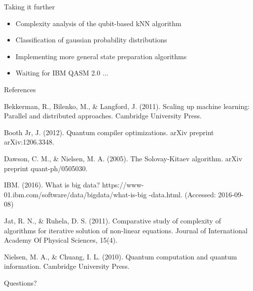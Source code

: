 \documentclass[10pt]{beamer}
\begin{document}
\begin{frame}{Taking it further}

\begin{itemize}
\item Complexity analysis of the qubit-based kNN algorithm
\item Classification of gaussian probability distributions
\item Implementing more general state preparation algorithms
\item Waiting for IBM QASM 2.0 ...
\end{itemize}
\end{frame}

\begin{frame}{References}

\footnotesize{Bekkerman, R., Bilenko, M., \& Langford, J. (2011). Scaling up machine learning: Parallel and distributed
approaches. Cambridge University Press.\newline

Booth Jr, J. (2012). Quantum compiler optimizations. arXiv preprint arXiv:1206.3348.

Dawson, C. M., \& Nielsen, M. A. (2005). The Solovay-Kitaev algorithm. arXiv preprint quant-ph/0505030.\newline

IBM. (2016). What is big data? https://www-01.ibm.com/software/data/bigdata/what-is-big
-data.html. (Accessed: 2016-09-08) \newline

Jat, R. N., \& Ruhela, D. S. (2011). Comparative study of complexity of algorithms for iterative solution of non-linear equations. Journal of International Academy Of Physical Sciences, 15(4).\newline

Nielsen, M. A., \& Chuang, I. L. (2010). Quantum computation and quantum information. Cambridge University Press.}
\end{frame}

\begin{frame}[standout]
  Questions?
\end{frame}
\end{document}
